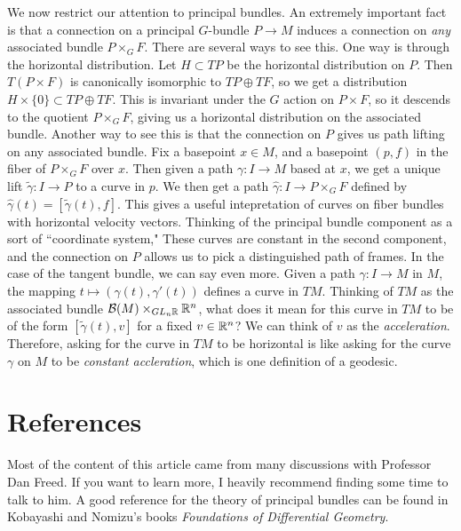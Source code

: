\documentclass[abstract=on,twoside]{scrreprt}
\begin{document}
We now restrict our attention to principal bundles. An extremely important fact
is that a connection on a principal $G$-bundle $P \to M$ induces a connection
on \emph{any} associated bundle $P \times_G F$. There are several ways to see this.
One way is through the horizontal distribution. Let $H \subset TP$ be the horizontal
distribution on $P$. Then $T(P \times F)$ is canonically isomorphic to $TP \oplus TF$,
so we get a distribution $H \times \{0\} \subset TP \oplus TF$. This is invariant
under the $G$ action on $P \times F$, so it descends to the quotient $P \times_G F$,
giving us a horizontal distribution on the associated bundle. Another way to
see this is that the connection on $P$ gives us path lifting on any associated bundle.
Fix a basepoint $x \in M$, and a basepoint $(p, f)$ in the fiber of $P \times_G F$
over $x$. Then given a path $\gamma : I \to M$ based at $x$, we get a unique lift
$\widetilde{\gamma} : I \to P$ to a curve in $p$. We then get a path
$\widehat{\gamma} : I \to P \times_G F$ defined by
$\widehat{\gamma}(t) = [\widetilde{\gamma}(t), f]$. This gives a useful intepretation
of curves on fiber bundles with horizontal velocity vectors. Thinking of the
principal bundle component as a sort of ``coordinate system," These curves
are constant in the second component, and the connection on $P$ allows us to pick a
distinguished path of frames. In the case of the tangent bundle, we can say
even more. Given a path $\gamma : I \to M$ in $M$, the mapping
$t \mapsto (\gamma(t), \gamma'(t))$ defines a curve in $TM$. Thinking of $TM$ as the
associated bundle $\mathcal{B}(M) \times_{GL_n\mathbb{R}} \mathbb{R}^n$, what does it mean
for this curve in $TM$ to be of the form $[\widetilde{\gamma}(t), v]$ for a fixed
$v \in \mathbb{R}^n$? We can think of $v$ as the \emph{acceleration}. Therefore, asking for
the curve in $TM$ to be horizontal is like asking for the curve $\gamma$ on $M$ to
be \emph{constant accleration}, which is one definition of a geodesic.
%
\section*{References}
%
Most of the content of this article came from many discussions with Professor Dan
Freed. If you want to learn more, I heavily recommend finding some time to talk to
him.  A good reference for the theory of principal bundles can be found in Kobayashi
and Nomizu's books \emph{Foundations of Differential Geometry}.
%
\end{document}
